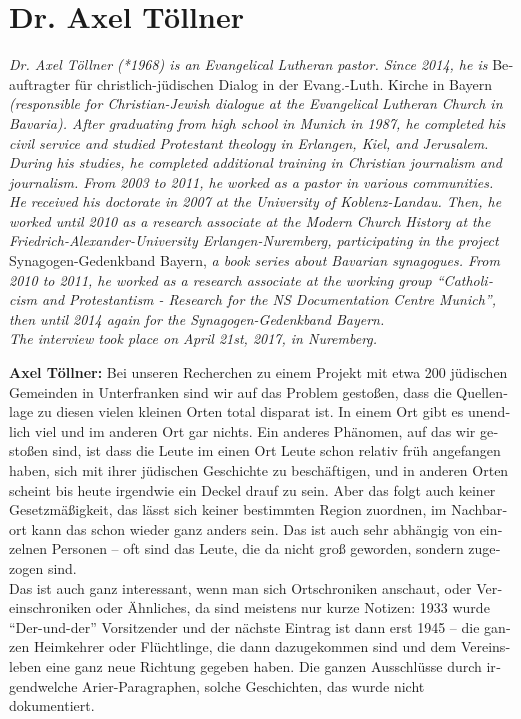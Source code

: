\section{Dr. Axel Töllner}
\begin{otherlanguage}{ngerman}
\textit{Dr. Axel Töllner (*1968) is an Evangelical Lutheran pastor. Since 2014, he is} Beauftragter für christlich-jüdischen Dialog in der Evang.-Luth. Kirche in Bayern \textit{(responsible for Christian-Jewish dialogue at the Evangelical Lutheran Church in Bavaria). After graduating from high school in Munich in 1987, he completed his civil service and studied Protestant theology in Erlangen, Kiel, and Jerusalem. During his studies, he completed additional training in Christian journalism and journalism. From 2003 to 2011, he worked as a pastor in various communities. He received his doctorate in 2007 at the University of Koblenz-Landau. Then, he worked until 2010 as a research associate at the Modern Church History at the Friedrich-Alexander-University Erlangen-Nuremberg, participating in the project} Synagogen-Gedenkband Bayern, \textit{a book series about Bavarian synagogues. From 2010 to 2011, he worked as a research associate at the working group ``Catholicism and Protestantism - Research for the NS Documentation Centre Munich'', then until 2014 again for the Synagogen-Gedenkband Bayern. \\
The interview took place on April 21st, 2017, in Nuremberg.}\par  
\vspace*{2em}
\textbf{Axel Töllner:} Bei unseren Recherchen zu einem Projekt mit etwa 200 jüdischen Gemeinden in Unterfranken sind wir auf das Problem gestoßen, dass die Quellenlage zu diesen vielen kleinen Orten total disparat ist. In einem Ort gibt es unendlich viel und im anderen Ort gar nichts. Ein anderes Phänomen, auf das wir gestoßen sind, ist dass die Leute im einen Ort Leute schon relativ früh angefangen haben, sich mit ihrer jüdischen Geschichte zu beschäftigen, und in anderen Orten scheint bis heute irgendwie ein Deckel drauf zu sein. Aber das folgt auch keiner Gesetzmäßigkeit, das lässt sich keiner bestimmten Region zuordnen, im Nachbarort kann das schon wieder ganz anders sein. Das ist auch sehr abhängig von einzelnen Personen – oft sind das Leute, die da nicht groß geworden, sondern zugezogen sind.\\
Das ist auch ganz interessant, wenn man sich Ortschroniken anschaut, oder Vereinschroniken oder Ähnliches, da sind meistens nur kurze Notizen: 1933 wurde "`Der-und-der"' Vorsitzender und der nächste Eintrag ist dann erst 1945 – die ganzen Heimkehrer oder Flüchtlinge, die dann dazugekommen sind und dem Vereinsleben eine ganz neue Richtung gegeben haben. Die ganzen Ausschlüsse durch irgendwelche Arier-Paragraphen, solche Geschichten, das wurde nicht dokumentiert.\\ 

\end{otherlanguage}
